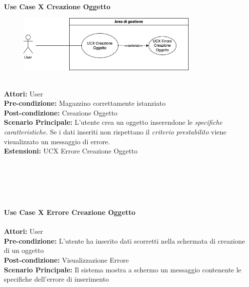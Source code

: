 \Large\textbf{}\\
\Large\textbf{Use Case X Creazione Oggetto} \\
\vspace{0.5cm}
\begin{figure}[h]
  \centering
  \includegraphics[width=0.8\textwidth]{UseCasesImages/ObjCr.png}
\end{figure}

\large\textbf{} \\
\textbf{Attori:} User\\
\textbf{Pre-condizione:} Magazzino correttamente istanziato \\
\textbf{Post-condizione: } Creazione Oggetto\\
\textbf{Scenario Principale:}  L'utente crea un oggetto inserendone le \textit{specifiche caratteristiche}. Se i dati inseriti non rispettano il \textit{criterio prestabilito} viene visualizzato un messaggio di errore.\\
\textbf{Estensioni: } UCX Errore Creazione Oggetto\\

\vspace{0.5cm}

\textbf{}\\
{} \\
{}\\

\vspace{0.5cm}

\Large\textbf{}\\
\Large\textbf{Use Case X Errore Creazione Oggetto} \\
\large\textbf{} \\
\textbf{Attori:} User\\
\textbf{Pre-condizione:} L'utente ha inserito dati scorretti nella schermata di creazione di un oggetto\\
\textbf{Post-condizione: } Visualizzazione Errore\\
\textbf{Scenario Principale:} Il sistema mostra a schermo un messaggio contenente le specifiche dell'errore di inserimento\\

